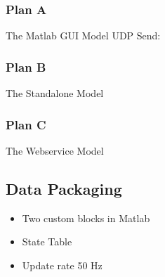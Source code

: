 \subsubsection{Plan A}
The Matlab GUI Model
UDP Send: \cite{web:UDPSend}
\subsubsection{Plan B}
The Standalone Model
\subsubsection{Plan C}
The Webservice Model

\subsection{Data Packaging}
\begin{itemize}
	\item Two custom blocks in Matlab
	\item State Table
	\item Update rate 50 Hz
\end{itemize}